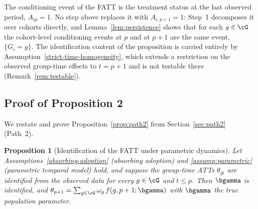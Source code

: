 \documentclass{article}
\newtheorem*{proposition*}{Proposition}
\begin{document}
\begin{remark}
The conditioning event of the FATT is the treatment status at the last observed period, $A_{ip}=1$. No step above replaces it with $A_{i,p+1}=1$: Step~1 decomposes it over cohorts directly, and Lemma~\ref{lem:persistence} shows that for each $g \in \cG$ the cohort-level conditioning events at $p$ and at $p+1$ are the same event, $\{G_i=g\}$. The identification content of the proposition is carried entirely by Assumption~\ref{strict-time-homogeneity}, which extends a restriction on the observed group-time effects to $t = p+1$ and is not testable there (Remark~\ref{rem:testable}).
\end{remark}

\subsection{Proof of Proposition 2}\label{app:prop2}

We restate and prove Proposition~\ref{prop:path2} from Section~\ref{sec:path2} (Path~2).

\begin{proposition*}[Identification of the FATT under parametric dynamics]
Let Assumptions~\ref{absorbing-adoption} (absorbing adoption) and \ref{assump:parametric} (parametric temporal model) hold, and suppose the group-time ATTs $\theta_{gt}$ are identified from the observed data for every $g \in \cG$ and $t \leq p$. Then $\bgamma$ is identified, and $\theta_{p+1} = \sum_{g \in \cG} \omega_g\, f(g,p+1;\bgamma)$ with $\bgamma$ the true population parameter.
\end{proposition*}
\end{document}
